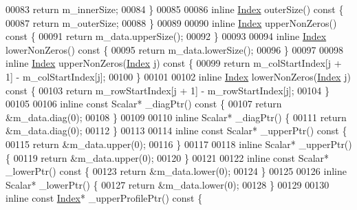 \begin{DoxyCode}
00083         \textcolor{keywordflow}{return} m\_innerSize;
00084     \}
00085 
00086     \textcolor{keyword}{inline} \hyperlink{group___core___module_a554f30542cc2316add4b1ea0a492ff02}{Index} outerSize()\textcolor{keyword}{ const }\{
00087         \textcolor{keywordflow}{return} m\_outerSize;
00088     \}
00089 
00090     \textcolor{keyword}{inline} \hyperlink{group___core___module_a554f30542cc2316add4b1ea0a492ff02}{Index} upperNonZeros()\textcolor{keyword}{ const }\{
00091         \textcolor{keywordflow}{return} m\_data.upperSize();
00092     \}
00093 
00094     \textcolor{keyword}{inline} \hyperlink{group___core___module_a554f30542cc2316add4b1ea0a492ff02}{Index} lowerNonZeros()\textcolor{keyword}{ const }\{
00095         \textcolor{keywordflow}{return} m\_data.lowerSize();
00096     \}
00097 
00098     \textcolor{keyword}{inline} \hyperlink{group___core___module_a554f30542cc2316add4b1ea0a492ff02}{Index} upperNonZeros(\hyperlink{group___core___module_a554f30542cc2316add4b1ea0a492ff02}{Index} j)\textcolor{keyword}{ const }\{
00099         \textcolor{keywordflow}{return} m\_colStartIndex[j + 1] - m\_colStartIndex[j];
00100     \}
00101 
00102     \textcolor{keyword}{inline} \hyperlink{group___core___module_a554f30542cc2316add4b1ea0a492ff02}{Index} lowerNonZeros(\hyperlink{group___core___module_a554f30542cc2316add4b1ea0a492ff02}{Index} j)\textcolor{keyword}{ const }\{
00103         \textcolor{keywordflow}{return} m\_rowStartIndex[j + 1] - m\_rowStartIndex[j];
00104     \}
00105 
00106     \textcolor{keyword}{inline} \textcolor{keyword}{const} Scalar* \_diagPtr()\textcolor{keyword}{ const }\{
00107         \textcolor{keywordflow}{return} &m\_data.diag(0);
00108     \}
00109 
00110     \textcolor{keyword}{inline} Scalar* \_diagPtr() \{
00111         \textcolor{keywordflow}{return} &m\_data.diag(0);
00112     \}
00113 
00114     \textcolor{keyword}{inline} \textcolor{keyword}{const} Scalar* \_upperPtr()\textcolor{keyword}{ const }\{
00115         \textcolor{keywordflow}{return} &m\_data.upper(0);
00116     \}
00117 
00118     \textcolor{keyword}{inline} Scalar* \_upperPtr() \{
00119         \textcolor{keywordflow}{return} &m\_data.upper(0);
00120     \}
00121 
00122     \textcolor{keyword}{inline} \textcolor{keyword}{const} Scalar* \_lowerPtr()\textcolor{keyword}{ const }\{
00123         \textcolor{keywordflow}{return} &m\_data.lower(0);
00124     \}
00125 
00126     \textcolor{keyword}{inline} Scalar* \_lowerPtr() \{
00127         \textcolor{keywordflow}{return} &m\_data.lower(0);
00128     \}
00129 
00130     \textcolor{keyword}{inline} \textcolor{keyword}{const} \hyperlink{group___core___module_a554f30542cc2316add4b1ea0a492ff02}{Index}* \_upperProfilePtr()\textcolor{keyword}{ const }\{

\end{DoxyCode}
